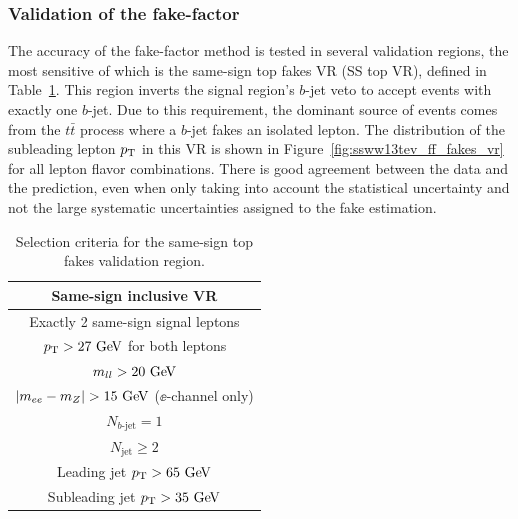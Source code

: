 \subsubsection{Validation of the fake-factor}\label{ssww13tev:ff_vr}
The accuracy of the fake-factor method is tested in several validation regions, the most sensitive of which is the same-sign top fakes VR (SS top VR), defined in Table~\ref{tab:ssww13tev_topfakes_vr_def}.
This region inverts the signal region's $b$-jet veto to accept events with exactly one $b$-jet.
Due to this requirement, the dominant source of events comes from the $t\bar{t}$ process where a $b$-jet fakes an isolated lepton.
The distribution of the subleading lepton $p_{\mathrm{T}}$ in this VR is shown in Figure~\ref{fig:ssww13tev_ff_fakes_vr} for all lepton flavor combinations.
There is good agreement between the data and the prediction, even when only taking into account the statistical uncertainty and not the large systematic uncertainties assigned to the fake estimation.

\begin{table}[htbp]
  \centering
  \begin{tabular}{c}
    Same-sign inclusive VR \\
    \hline\hline
    Exactly 2 same-sign signal leptons\\
    $\pt > 27\gev$ for both leptons \\
    $m_{ll} > 20\gev$\\
    $|m_{ee} - m_Z| > 15\gev$ ($\ee$-channel only) \\
    $N_{b\textrm{-jet}} = 1$\\
    $N_{\textrm{jet}} \ge 2$ \\
    Leading jet $\pt > 65\gev$ \\
    Subleading jet $\pt > 35\gev$ \\
    \hline
  \end{tabular}
  \caption{Selection criteria for the same-sign top fakes validation region.}
  \label{tab:ssww13tev_topfakes_vr_def}
\end{table}


